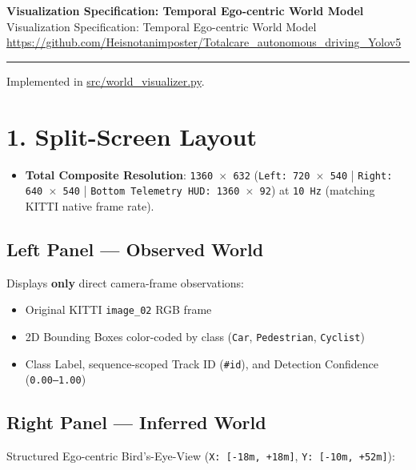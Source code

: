 \documentclass[10.5pt,a4paper]{article}
\begin{document}
\begin{center}
{\LARGE\bfseries Visualization Specification: Temporal Ego-centric World Model}\\[6pt]
{\normalsize\color{gray} Visualization Specification: Temporal Ego-centric World Model}\\[4pt]
{\small\href{https://github.com/Heisnotanimposter/Totalcare_autonomous_driving_Yolov5}{https://github.com/Heisnotanimposter/Totalcare\_autonomous\_driving\_Yolov5}}
\end{center}
\vspace{4pt}
\hrule
\vspace{8pt}

Implemented in \href{https://github.com/Heisnotanimposter/Totalcare\_autonomous\_driving\_Yolov5/blob/main/src/world\_visualizer.py}{src/world\_visualizer.py}.


\section{1. Split-Screen Layout}

\begin{itemize}[leftmargin=1.5em,itemsep=2pt]
\item \textbf{Total Composite Resolution}: \texttt{1360 $\times$ 632} (\texttt{Left:\allowbreak{} 720 $\times$ 540} | \texttt{Right:\allowbreak{} 640 $\times$ 540} | \texttt{Bottom Telemetry HUD:\allowbreak{} 1360 $\times$ 92}) at \texttt{10 Hz} (matching KITTI native frame rate).
\end{itemize}

\subsection{Left Panel --- Observed World}
Displays \textbf{only} direct camera-frame observations:

\begin{itemize}[leftmargin=1.5em,itemsep=2pt]
\item Original KITTI \texttt{image\_\allowbreak{}02} RGB frame
\item 2D Bounding Boxes color-coded by class (\texttt{Car}, \texttt{Pedestrian}, \texttt{Cyclist})
\item Class Label, sequence-scoped Track ID (\texttt{\#id}), and Detection Confidence (\texttt{0.\allowbreak{}00--1.\allowbreak{}00})
\end{itemize}

\subsection{Right Panel --- Inferred World}
Structured Ego-centric Bird's-Eye-View (\texttt{X:\allowbreak{} [-\allowbreak{}18m,\allowbreak{} +18m]}, \texttt{Y:\allowbreak{} [-\allowbreak{}10m,\allowbreak{} +52m]}):
\end{document}
